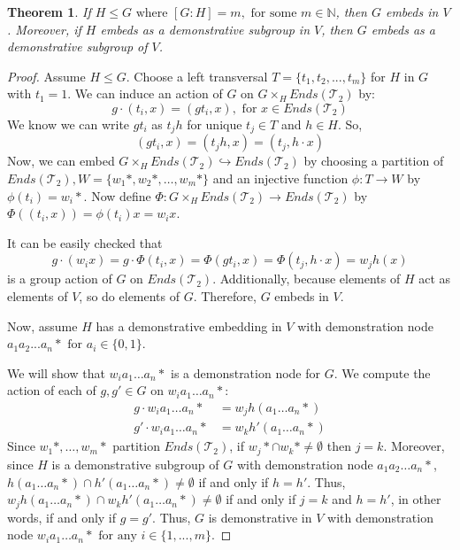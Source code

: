 \documentclass[11pt]{amsart}
\theoremstyle{plain}
\newtheorem{theorem}{Theorem}[section]
\theoremstyle{remark}
\theoremstyle{definition}
\theoremstyle{remark}
\theoremstyle{named}
\begin{document}
\begin{theorem}\label{dem1}
If $H \le G \text{ where }[G:H] =m, \text{ for some } m\in \mathbb{N}$, then $G$ embeds in $V$. Moreover, if $H$ embeds as a demonstrative subgroup in $V$, then $G$ embeds as a demonstrative subgroup of $V$.
\end{theorem}
\begin{proof}Assume $H \le G$. Choose a left transversal $T = \{t_1, t_2, ... , t_m\}$ for $H$ in $G$ with $t_1=1$. 
We can induce an action of $G$ on $G \times_H Ends(\mathcal{T}_2)$ by:
\[g \cdot (t_i,x) = (gt_i,x), \text{ for } x \in Ends(\mathcal{T}_2)\]
We know we can write $gt_i$ as $t_jh$ for unique $t_j \in T$ and $h \in H$. So,
\[(gt_i,x)=(t_jh,x) = (t_j, h \cdot x)\]
Now, we can embed $G \times_H Ends(\mathcal{T}_2) \hookrightarrow Ends(\mathcal{T}_2)$ by choosing a partition of $Ends(\mathcal{T}_2), W = \{w_1\ast , w_2\ast , \dots, w_m\ast\}$ and an injective function $\phi : T \to W$ by $\phi (t_i)=w_i \ast$. Now define $\Phi: G \times_H Ends(\mathcal{T}_2) \to Ends(\mathcal{T}_2)$ by $\Phi((t_i,x)) = \phi(t_i)x=w_ix$.

It can be easily checked that 
\[g \cdot (w_ix)=g \cdot \Phi(t_i,x)=\Phi(gt_i,x)=\Phi(t_j,h \cdot x)=w_jh(x)\] 
is a group action of $G$ on $Ends(\mathcal{T}_2)$. Additionally, because elements of $H$ act as elements of $V$, so do elements of $G$. Therefore, $G$ embeds in $V$. 

Now, assume $H$ has a demonstrative embedding in $V$ with demonstration node $a_1a_2 ... a_{n}* \text{ for } a_i \in \{0,1\}$.

We will show that $w_ia_1 \dots a_n*$ is a demonstration node for $G$. We compute the action of each of $g,g' \in G$ on $w_ia_1 \dots a_n*$:
\begin{align*}
g \cdot w_ia_1 \dots a_n* &= w_jh(a_1 \dots a_n*) \\
g' \cdot w_ia_1 \dots a_n* &= w_kh'(a_1 \dots a_n*)
\end{align*}
Since $w_1*, \dots , w_m*$ partition $Ends(\mathcal{T}_2)$, if $w_j* \cap w_k*\not=\emptyset$ then $j=k$. Moreover, since $H$ is a demonstrative subgroup of $G$ with demonstration node $a_1a_2 \dots a_n *$, $h(a_1 \dots a_n \ast) \cap h'(a_1 \dots a_n*) \not= \emptyset$ if and only if $h=h'$. Thus, $w_jh(a_1 \dots a_n*) \cap w_kh'(a_1 \dots a_n*) \not= \emptyset$ if and only if $j=k$ and $h=h'$, in other words, if and only if $g=g'$. Thus, $G$ is demonstrative in $V$ with demonstration node $w_ia_1 \dots a_n* \text { for any } i \in \{1, ... , m\}$. 
\end{proof}
\end{document}
